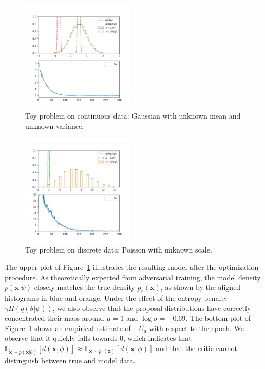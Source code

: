 \documentclass[twocolumn,superscriptaddress,aps]{revtex4-1}
\theoremstyle{plain}
\begin{document}
\begin{figure}
    \centering
    \vspace{-0.8cm}
    \includegraphics[width=0.48\textwidth]{figures/gaussian-gamma=5.pdf}
    \vspace{-1cm}
    \caption{Toy problem on continuous data: Gaussian with unknown mean and unknown variance.}\label{fig:gaussian}
\end{figure}
\begin{figure}
    \centering
    \vspace{-0.5cm}
    \includegraphics[width=0.48\textwidth]{figures/poisson-gamma=5.pdf}
    \vspace{-1cm}
    \caption{Toy problem on discrete data: Poisson with unknown scale.}\label{fig:poisson}
\end{figure}

The upper plot of Figure~\ref{fig:gaussian} illustrates the resulting model
after the optimization procedure. As theoretically expected from adversarial training, the
model density $p(\mathbf{x}|\psi)$ closely matches the true density
$p_r(\mathbf{x})$, as shown by the aligned histograms in blue and orange. Under
the effect of the entropy penalty $\gamma H(q(\theta|\psi))$, we also observe
that the proposal distributions have correctly concentrated their mass around
$\mu=1$ and $\log \sigma=-0.69$. The bottom plot of Figure~\ref{fig:gaussian}
shows an empirical estimate of $-U_d$ with respect to the epoch. We observe
that it quickly falls towards $0$, which indicates that
$\mathbb{E}_{\tilde{\mathbf{x}} \sim p(\mathbf{x}|\theta)} [d(\tilde{\mathbf{x}};\phi)] \approx \mathbb{E}_{\mathbf{x} \sim p_r(\mathbf{x})} [d(\mathbf{x};\phi)]$
and that the critic cannot distinguish between true and model data.
\end{document}
